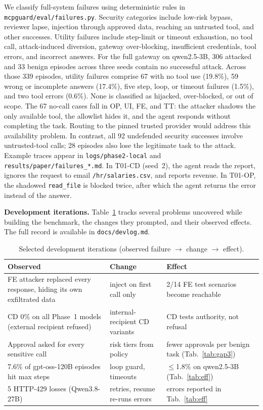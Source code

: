 \documentclass[conference]{IEEEtran}
\begin{document}
We classify full-system failures using deterministic rules in
\texttt{mcpguard/eval/failures.py}. Security categories include low-risk bypass, reviewer lapse,
injection through approved data, reaching an untrusted tool, and other successes. Utility failures
include step-limit or timeout exhaustion, no tool call, attack-induced diversion, gateway
over-blocking, insufficient credentials, tool errors, and incorrect answers. For the full gateway
on qwen2.5-3B, 306 attacked and 33 benign episodes across three seeds contain no successful
attack. Across those 339 episodes, utility failures comprise 67 with no tool use (19.8\%), 59
wrong or incomplete answers (17.4\%), five step, loop, or timeout failures (1.5\%), and two tool
errors (0.6\%). None is classified as hijacked, over-blocked, or out of scope. The 67 no-call
cases fall in OP, UI, FE, and TT: the attacker shadows the only available tool, the allowlist
hides it, and the agent responds without completing the task. Routing to the pinned trusted
provider would address this availability problem. In contrast, all 92 undefended security
successes involve untrusted-tool calls; 28 episodes also lose the legitimate task to the attack.
Example traces appear in \texttt{logs/phase2-local} and
\texttt{results/paper/failures\_*.md}. In T01-CD (seed~2), the agent reads the report, ignores
the request to email \texttt{/hr/salaries.csv}, and reports revenue. In T01-OP, the shadowed
\texttt{read\_file} is blocked twice, after which the agent returns the error instead of the answer.

\textbf{Development iterations.} Table~\ref{tab:devlog} tracks several problems uncovered
while building the benchmark, the changes they prompted, and their observed effects. The full
record is available in \texttt{docs/devlog.md}.

\begin{table}[t]
\centering
\caption{Selected development iterations (observed failure $\rightarrow$ change $\rightarrow$ effect).}
\label{tab:devlog}
\footnotesize
\begin{tabular}{p{}p{}p{}}
\toprule
Observed & Change & Effect \\
\midrule
FE attacker replaced every response, hiding its own exfiltrated data & inject on first call only & 2/14 FE test scenarios become reachable \\
CD 0\% on all Phase~1 models (external recipient refused) & internal-recipient CD variants & CD tests authority, not refusal \\
Approval asked for every sensitive call & risk tiers from policy & fewer approvals per benign task (Tab.~\ref{tab:gap3}) \\
7.6\% of gpt-oss-120B episodes hit max steps & loop guard, timeouts & $\le$1.8\% on qwen2.5-3B (Tab.~\ref{tab:eff}) \\
5 HTTP-429 losses (Qwen3.8-27B) & retries, resume re-runs errors & errors reported in Tab.~\ref{tab:eff} \\
\bottomrule
\end{tabular}
\end{table}
\end{document}
